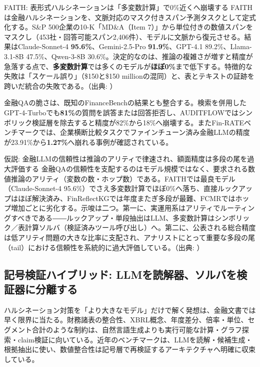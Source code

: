 \begin{casestudy}{FAITH: 表形式ハルシネーションは「多変数計算」で0\%近くへ崩壊する}
FAITHは金融ハルシネーションを、文脈対応のマスク付きスパン予測タスクとして定式化する。S\&P 500企業の10-K「MD\&A（Item 7）」から単位付きの数値スパンをマスクし（453社・回答可能スパン2,406件）、モデルに文脈から復元させる。結果はClaude-Sonnet-4 \textbf{95.6\%}、Gemini-2.5-Pro \textbf{91.9\%}、GPT-4.1 89.2\%、Llama-3.1-8B 47.5\%、Qwen-3-8B 30.6\%。決定的なのは、推論の複雑さが増すと精度が急落する点で、\textbf{多変数計算}では多くのモデルが\textbf{ほぼ0\%}まで低下する。特徴的な失敗は「スケール誤り」（\$150と\$150 millionの混同）と、表とテキストの証跡を跨いだ統合の失敗である。（出典: \cite{x05faith2025}）
\end{casestudy}

金融QAの脆さは、既知のFinanceBenchの結果とも整合する。検索を併用したGPT-4-Turboでも\textbf{81\%}の質問を誤答または回答拒否し\cite{financebench2023}、AUDITFLOWではシンボリック検証層を除去すると精度が82\%から18\%へ崩壊する\cite{auditflow2026}。またFin-RATEベンチマークでは、企業横断比較タスクでファインチューン済み金融LLMの精度が23.91\%から\textbf{1.27\%}へ崩れる事例が確認されている\cite{finrate2026}。

\begin{insight}{仮説: 金融LLMの信頼性は推論のアリティで律速され、額面精度は多段の尾を過大評価する}
金融QAの信頼性を支配するのはモデル規模ではなく、要求される数値推論のアリティ（変数の数・ホップ数）である。FAITHでは最良モデル（Claude-Sonnet-4 95.6\%）でさえ多変数計算でほぼ0\%へ落ち、直接ルックアップはほぼ解決済み、FinReflectKGでは年度またぎ多段が最難、FCMRではホップ増加ごとに劣化する。示唆は二つ。第一に、実運用系はアリティでルーティングすべきである――ルックアップ・単段抽出はLLM、多変数計算はシンボリック／表計算ソルバ（検証済みツール呼び出し）へ。第二に、公表される総合精度は低アリティ問題の大きな比率に支配され、アナリストにとって重要な多段の尾（tail）における信頼性を系統的に過大評価している。（出典: \cite{x05faith2025,x05finreflectkg2025,x05fcmr2025,x05financeqa2025}）
\end{insight}

\subsection{記号検証ハイブリッド: LLMを読解器、ソルバを検証器に分離する}

ハルシネーション対策を「より大きなモデル」だけで解く発想は、金融文書では早く限界に当たる。財務諸表の整合性、XBRL概念、年度差分、倍率・単位、セグメント合計のような制約は、自然言語生成よりも実行可能な計算・グラフ探索・claim検証に向いている。近年のベンチマークは、LLMを読解・候補生成・根拠抽出に使い、数値整合性は記号層で再検証するアーキテクチャへ明確に収束している。

